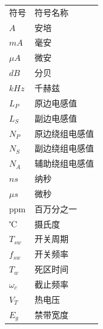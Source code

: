 \begin{center}
    {
    \renewcommand{\arraystretch}{1.28}
    \begin{tabular}{p{4cm}l}
        符号 & 符号名称 \\
        $A$ & 安培 \\
        $mA$ & 毫安 \\
        $\mu A$ & 微安\\
        $dB$ & 分贝 \\
        $kHz$ & 千赫兹 \\
        $L_P$ & 原边电感值 \\
        $L_S$ & 副边电感值 \\
        $N_P$ & 原边绕组电感值 \\
        $N_S$ & 副边绕组电感值 \\
        $N_A$ & 辅助绕组电感值 \\
        $ns$ & 纳秒 \\
        $\mu s$ & 微秒 \\
        ppm & 百万分之一 \\
        ℃ & 摄氏度 \\
        $T_{sw}$ & 开关周期 \\
        $f_{sw}$ & 开关频率 \\
        $T_w$ & 死区时间 \\
        $\omega_c$ & 截止频率 \\
        $V_T$ & 热电压 \\
        $E_{g}$ & 禁带宽度 \\
        
    \end{tabular}
    }
\end{center}

